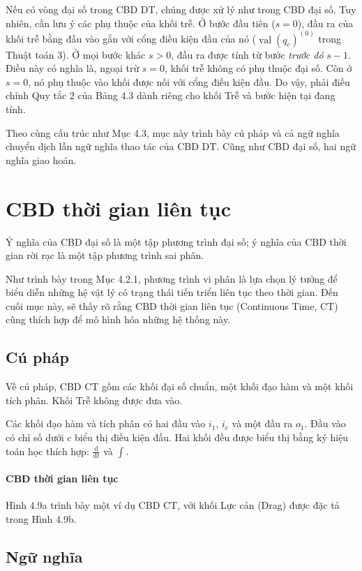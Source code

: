 Nếu có vòng đại số trong CBD DT, chúng được xử lý như trong CBD đại số. Tuy nhiên, cần lưu ý các phụ thuộc của khối trễ. Ở bước đầu tiên ($s=0$), đầu ra của khối trễ bằng đầu vào gắn với cổng điều kiện đầu của nó ($\operatorname{val}(q_c)^{(0)}$ trong Thuật toán 3). Ở mọi bước khác $s>0$, đầu ra được tính từ bước \emph{trước đó} $s-1$. Điều này có nghĩa là, ngoại trừ $s=0$, khối trễ không có phụ thuộc đại số. Còn ở $s=0$, nó phụ thuộc vào khối được nối với cổng điều kiện đầu. Do vậy, phải điều chỉnh Quy tắc 2 của Bảng 4.3 dành riêng cho khối Trễ và bước hiện tại đang tính.

Theo cùng cấu trúc như Mục 4.3, mục này trình bày cú pháp và cả ngữ nghĩa chuyển dịch lẫn ngữ nghĩa thao tác của CBD DT. Cũng như CBD đại số, hai ngữ nghĩa giao hoán.
\section{CBD thời gian liên tục}
Ý nghĩa của CBD đại số là một tập phương trình đại số; ý nghĩa của CBD thời gian rời rạc là một tập phương trình sai phân.

Như trình bày trong Mục 4.2.1, phương trình vi phân là lựa chọn lý tưởng để biểu diễn những hệ vật lý có trạng thái tiến triển liên tục theo thời gian. Đến cuối mục này, sẽ thấy rõ rằng CBD thời gian liên tục (Continuous Time, CT) cũng thích hợp để mô hình hóa những hệ thống này.

\subsection{Cú pháp}
Về cú pháp, CBD CT gồm các khối đại số chuẩn, một khối đạo hàm và một khối tích phân. Khối Trễ không được đưa vào.

Các khối đạo hàm và tích phân có hai đầu vào $i_1$, $i_c$ và một đầu ra $o_1$. Đầu vào có chỉ số dưới $c$ biểu thị điều kiện đầu. Hai khối đều được biểu thị bằng ký hiệu toán học thích hợp: $\frac{\mathrm{d}}{\mathrm{d}t}$ và $\int$.
\paragraph{CBD thời gian liên tục}
Hình 4.9a trình bày một ví dụ CBD CT, với khối Lực cản (Drag) được đặc tả trong Hình 4.9b.

\subsection{Ngữ nghĩa}
